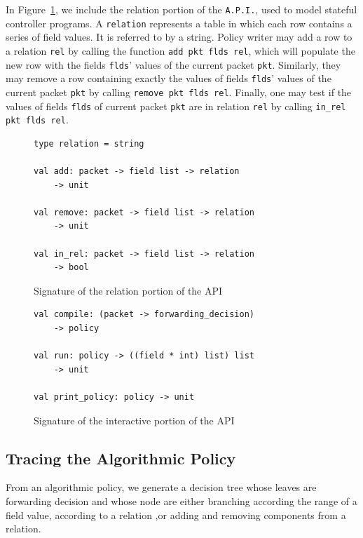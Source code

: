 \documentclass[preprint]{sigplanconf}
\begin{document}
In Figure~\ref{fig:rel_api}, we include the relation portion of the \lstinline|A.P.I.|, used to model stateful controller programs. A \lstinline|relation| represents a table in which each row contains a series of field values. It is referred to by a string. Policy writer may add a row to a relation \lstinline|rel| by calling the function \lstinline|add pkt flds rel|, which will populate the new row with the fields \lstinline|flds|' values of the current packet \lstinline|pkt|. Similarly, they may remove a row containing exactly the values of fields \lstinline|flds|' values of the current packet \lstinline|pkt| by calling \lstinline|remove pkt flds rel|. Finally, one may test if the values of fields \lstinline|flds| of current packet \lstinline|pkt| are in relation \lstinline|rel| by calling \lstinline|in_rel pkt flds rel|.



\begin{figure}[ht]
  \begin{lstlisting}
type relation = string

val add: packet -> field list -> relation
    -> unit

val remove: packet -> field list -> relation
    -> unit

val in_rel: packet -> field list -> relation
    -> bool
\end{lstlisting}

\caption{Signature of the relation portion of the API}
\label{fig:rel_api}
\end{figure}




\begin{figure}[ht]
  \begin{lstlisting}
val compile: (packet -> forwarding_decision)
    -> policy
    
val run: policy -> ((field * int) list) list
    -> unit
    
val print_policy: policy -> unit
  \end{lstlisting}

  \caption{Signature of the interactive portion of the API}
  \label{fig:build_api}
\end{figure}

\subsection*{Tracing the Algorithmic Policy}
From an algorithmic policy, we generate a decision tree  whose leaves are forwarding decision and whose node are either branching according the range of a field value, according to a relation ,or adding and removing components from a relation.
\end{document}
